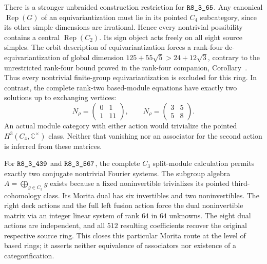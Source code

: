 There is a stronger unbraided construction restriction for $\sha{R8_3_65}$.
Any canonical $\operatorname{Rep}(G)$ of an equivariantization must lie in
its pointed $C_4$ subcategory, since its other simple dimensions are
irrational. Hence every nontrivial possibility contains a central
$\operatorname{Rep}(C_2)$. Its sign object acts freely on all eight source
simples. The orbit description of equivariantization forces a rank-four
de-equivariantization of global dimension $125+55\sqrt5>24+12\sqrt3$,
contrary to the unrestricted rank-four bound proved in the rank-four
companion, Corollary~. Thus every
nontrivial finite-group equivariantization is excluded for this ring.
In contrast, the complete rank-two based-module equations have exactly
two solutions up to exchanging vertices:
\[
N_\rho=\begin{pmatrix}0&1\\1&11\end{pmatrix},\qquad
N_\rho=\begin{pmatrix}3&5\\5&8\end{pmatrix}.
\]
An actual module category with either action would trivialize the pointed
$H^3(C_4,\mathbb C^\times)$ class. Neither that vanishing nor an
associator for the second action is inferred from these matrices.

For $\sha{R8_3_439}$ and $\sha{R8_3_567}$, the complete $C_3$ split-module
calculation permits exactly two conjugate nontrivial Fourier systems.
The subgroup algebra $A=\bigoplus_{g\in C_3}g$ exists because a fixed
noninvertible trivializes its pointed third-cohomology class. Its Morita
dual has six invertibles and two noninvertibles. The right deck actions
and the full left fusion action force the dual noninvertible matrix via
an integer linear system of rank $64$ in $64$ unknowns. The eight dual
actions are independent, and all $512$ resulting coefficients recover
the original respective source ring. This closes this particular Morita
route at the level of based rings; it asserts neither equivalence of
associators nor existence of a categorification.

